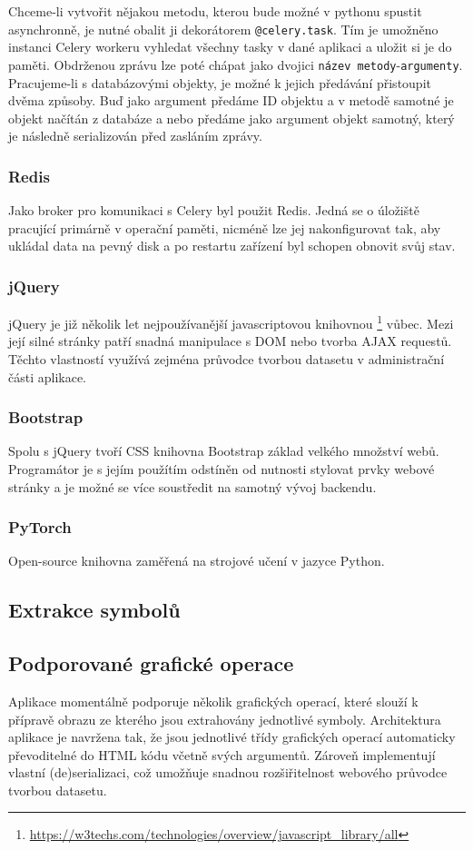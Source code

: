 \documentclass[
  field=ainfp,
  master=true,
  biblatex,
  sourcecodes=false,
  theorems=false,
  glossaries,
  index
]{kidiplom}
\begin{document}
Chceme-li vytvořit nějakou metodu, kterou bude možné v pythonu spustit asynchronně, je nutné obalit ji dekorátorem \texttt{@celery.task}. Tím je umožněno instanci Celery workeru vyhledat všechny tasky v dané aplikaci a uložit si je do paměti. Obdrženou zprávu lze poté chápat jako dvojici \texttt{název metody}-\texttt{argumenty}. Pracujeme-li s databázovými objekty, je možné k jejich předávání přistoupit dvěma způsoby. Buď jako argument předáme ID objektu a v metodě samotné je objekt načítán z databáze a nebo předáme jako argument objekt samotný, který je následně serializován před zasláním zprávy.

\subsubsection*{Redis}
Jako broker pro komunikaci s Celery byl použit Redis. Jedná se o úložiště pracující primárně v operační paměti, nicméně lze jej nakonfigurovat tak, aby ukládal data na pevný disk a po restartu zařízení byl schopen obnovit svůj stav.

\subsubsection*{jQuery}
jQuery je již několik let nejpoužívanější javascriptovou knihovnou \footnote{\url{https://w3techs.com/technologies/overview/javascript\_library/all}} vůbec. Mezi její silné stránky patří snadná manipulace s DOM nebo tvorba AJAX requestů. Těchto vlastností využívá zejména průvodce tvorbou datasetu v administrační části aplikace.
\subsubsection*{Bootstrap}
Spolu s jQuery tvoří CSS knihovna Bootstrap základ velkého množství webů. Programátor je s jejím použítím odstíněn od nutnosti stylovat prvky webové stránky a je možné se více soustředit na samotný vývoj backendu.
\subsubsection*{PyTorch}
Open-source knihovna zaměřená na strojové učení v jazyce Python. 


\subsection{Extrakce symbolů}

\subsection{Podporované grafické operace}
Aplikace momentálně podporuje několik grafických operací, které slouží k přípravě obrazu ze kterého jsou extrahovány jednotlivé symboly. Architektura aplikace je navržena tak, že jsou jednotlivé třídy grafických operací automaticky převoditelné do HTML kódu včetně svých argumentů. Zároveň implementují vlastní (de)se\-riali\-zaci, což umožňuje snadnou rozšiřitelnost webového průvodce tvorbou data\-setu.
\end{document}
